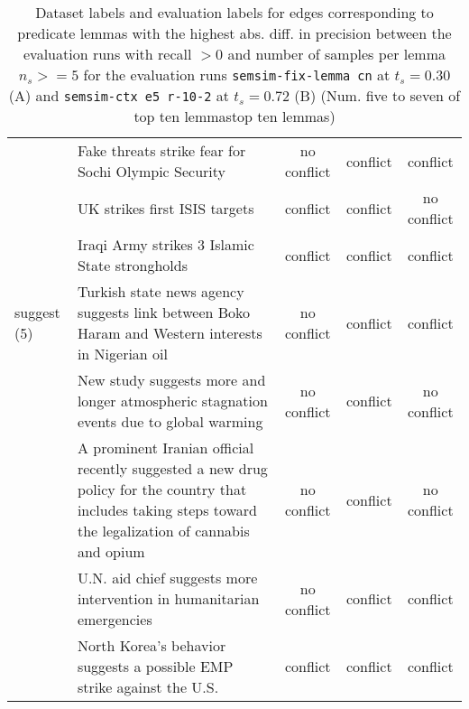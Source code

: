 \begin{sidewaystable}[ht]
\begin{tabular}{l p{13cm} ccc}
& Fake threats strike fear for Sochi Olympic Security & no conflict & conflict & conflict \\
& UK strikes first ISIS targets & conflict & conflict & no conflict \\
& Iraqi Army strikes 3 Islamic State strongholds & conflict & conflict & conflict \\
\hline
suggest (5)
& Turkish state news agency suggests link between Boko Haram and Western interests in Nigerian oil & no conflict & conflict & conflict \\
& New study suggests more and longer atmospheric stagnation events due to global warming & no conflict & conflict & no conflict \\
& A prominent Iranian official recently suggested a new drug policy for the country that includes taking steps toward the legalization of cannabis and opium & no conflict & conflict & no conflict \\
& U.N. aid chief suggests more intervention in humanitarian emergencies & no conflict & conflict & conflict \\
& North Korea's behavior suggests a possible EMP strike against the U.S. & conflict & conflict & conflict \\
\bottomrule
\end{tabular}
\caption{Dataset labels and evaluation labels for edges corresponding to predicate lemmas with the highest abs. diff. in precision between the evaluation runs with recall \(> 0\) and number of samples per lemma \(n_s >= 5\) for the evaluation runs \texttt{semsim-fix-lemma cn} at \(t_s = 0.30\) (A) and \texttt{semsim-ctx e5 r-10-2} at \(t_s = 0.72\) (B)  (Num. five to seven of top ten lemmastop ten lemmas)}
\label{tab:ples-labels-3}
\end{sidewaystable}


